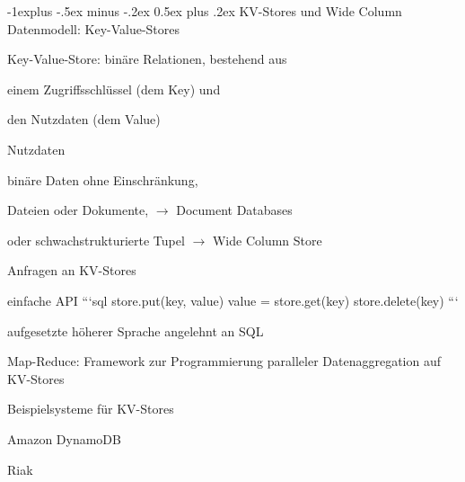 \documentclass[a4paper]{article}
\makeatletter
\renewcommand{\subsection}{\@startsection{subsection}{2}{0mm}%
                                {-1explus -.5ex minus -.2ex}%
                                {0.5ex plus .2ex}%
                                {\normalfont\normalsize\bfseries}}
\makeatother
\begin{document}
\begin{multicols}{3}
\begin{itemize*}
    \subsection{KV-Stores und Wide Column}
    Datenmodell: Key-Value-Stores
    \begin{itemize*}
        \item Key-Value-Store: binäre Relationen, bestehend aus
        \begin{itemize*}
            \item einem Zugriffsschlüssel (dem Key) und
            \item den Nutzdaten (dem Value)
        \end{itemize*}
        \item Nutzdaten
        \begin{itemize*}
            \item binäre Daten ohne Einschränkung,
            \item Dateien oder Dokumente, $\rightarrow$ Document Databases
            \item oder schwachstrukturierte Tupel $\rightarrow$ Wide Column Store
        \end{itemize*}
        \item Anfragen an KV-Stores
        \begin{itemize*}
            \item einfache API
            ```sql
            store.put(key, value)
            value = store.get(key)
            store.delete(key)
            ```
            \item aufgesetzte höherer Sprache angelehnt an SQL
            \item Map-Reduce: Framework zur Programmierung paralleler Datenaggregation auf KV-Stores
        \end{itemize*}
        \item Beispielsysteme für KV-Stores
        \begin{itemize*}
            \item Amazon DynamoDB
            \item Riak
        \end{itemize*}
    \end{itemize*}


\end{itemize*}
\end{multicols}
\end{document}
